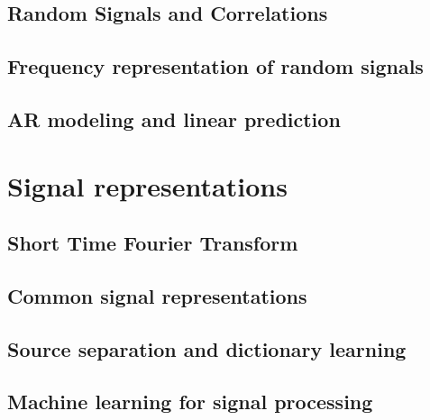 \documentclass[a4paper, 10pt, dvipsnames]{book}
\begin{document}
\section{Random Signals and Correlations}
\label{sec:}

\section{Frequency representation of random signals}
\label{sec:}

\section{AR modeling and linear prediction}
\label{sec:}

\chapter{Signal representations}

\section{Short Time Fourier Transform}
\label{sec:}

\section{Common signal representations}
\label{sec:}

\section{Source separation and dictionary learning}
\label{sec:}


\section{Machine learning for signal processing}
\label{sec:}


\ForceHTMLTOC 
\ForceHTMLPage


\end{document}
